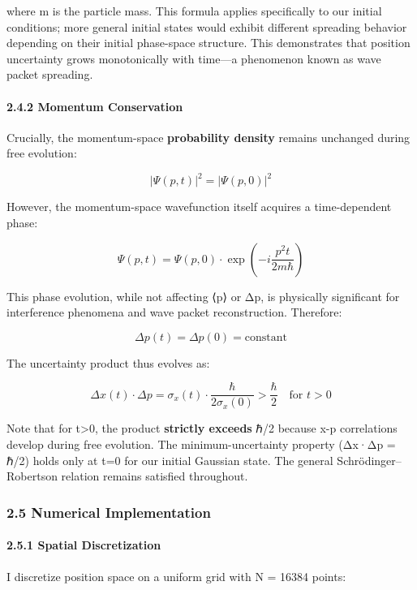 \documentclass[
]{article}
\begin{document}
where m is the particle mass. This formula applies specifically to our
initial conditions; more general initial states would exhibit different
spreading behavior depending on their initial phase-space structure.
This demonstrates that position uncertainty grows monotonically with
time---a phenomenon known as wave packet spreading.

\paragraph{2.4.2 Momentum Conservation}\label{momentum-conservation}

Crucially, the momentum-space \textbf{probability density} remains
unchanged during free evolution:

\[|\Psi(p,t)|^2 = |\Psi(p,0)|^2\]

However, the momentum-space wavefunction itself acquires a
time-dependent phase:

\[\Psi(p,t) = \Psi(p,0) \cdot \exp\left(-i\frac{p^2 t}{2m\hbar}\right)\]

This phase evolution, while not affecting ⟨p⟩ or Δp, is physically
significant for interference phenomena and wave packet reconstruction.
Therefore:

\[\Delta p(t) = \Delta p(0) = \text{constant}\]

The uncertainty product thus evolves as:

\[\Delta x(t) \cdot \Delta p = \sigma_x(t) \cdot \frac{\hbar}{2\sigma_x(0)} > \frac{\hbar}{2} \quad \text{for } t>0\]

Note that for t\textgreater0, the product \textbf{strictly exceeds} ℏ/2
because x-p correlations develop during free evolution. The
minimum-uncertainty property (Δx·Δp = ℏ/2) holds only at t=0 for our
initial Gaussian state. The general Schrödinger--Robertson relation
remains satisfied throughout.

\subsubsection{2.5 Numerical
Implementation}\label{numerical-implementation}

\paragraph{2.5.1 Spatial Discretization}\label{spatial-discretization}

I discretize position space on a uniform grid with N = 16384 points:
\end{document}
